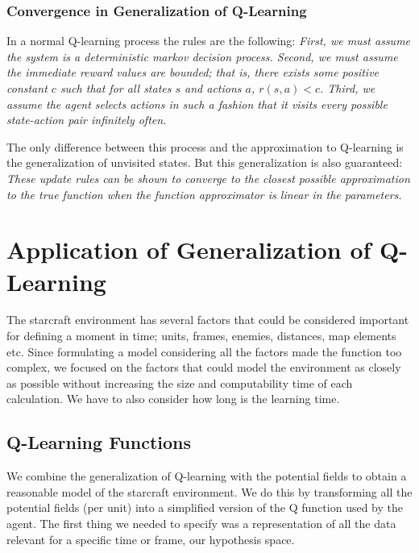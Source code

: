 \subsubsection{Convergence in Generalization of Q-Learning}

In a normal Q-learning process the rules are the following: \textit{First, we must assume the system is a deterministic markov decision process. Second, we must assume the immediate reward values are bounded; that is, there exists some positive constant $c$ such that for all states $s$ and actions $a$, $r(s,a) < c$. Third, we assume the agent selects actions in such a fashion that it visits every possible state-action pair infinitely often.} \cite[p377]{ml_tom_mitchel} 

The only difference between this process and the approximation to Q-learning is the generalization of unvisited states. But this generalization is also guaranteed: \textit{These update rules can be shown to converge to the closest possible approximation to the true function when the function approximator is linear in the parameters. }\cite[p779]{rl}



\section{Application of Generalization of Q-Learning}	\label{qlearning}

The starcraft environment has several factors that could be considered important for defining a moment in time; units, frames, enemies, distances, map elements etc. Since formulating a model considering all the factors made the function too complex, we focused on the factors that could model the environment as closely as possible without increasing the size and computability time of each calculation. We have to also consider how long is the learning time. 

\subsection{Q-Learning Functions}

We combine the generalization of Q-learning with the potential fields to obtain a reasonable model of the starcraft environment. We do this by transforming all the potential fields (per unit) into a simplified version of the Q function used by the agent. The first thing we needed to specify was a representation of all the data relevant for a specific time or frame, our hypothesis space. 

